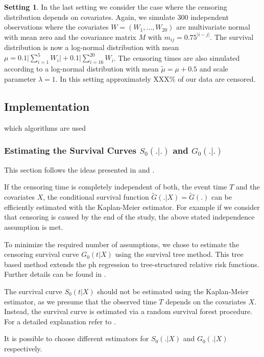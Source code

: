 \documentclass[12pt, a4paper]{article}
\theoremstyle{definition}
\newtheorem{setting}{Setting}
\theoremstyle{plain}
\numberwithin{equation}{section}
\numberwithin{figure}{section}
\numberwithin{table}{section}
\begin{document}
	\begin{setting}
		In the last setting we consider the case where the censoring distribution depends on covariates.
		Again, we simulate 300 independent observations where the covariates $W=(W_1,\dots,W_{20})$ are multivariate normal with mean zero and the covariance matrix $M$ with $m_{ij}=0.75^{\vert i-j\vert}$.
		The survival distribution is now a log-normal distribution with mean $\mu = 0.1 \vert \sum_{i=1}^5 W_i \vert + 0.1 \vert \sum_{i=16}^{20}W_i$.
		The censoring times are also simulated according to a log-normal distribution with mean $\tilde{\mu}=\mu+0.5$ and scale parameter $\lambda = 1$.
		In this setting approximately XXX\% of our data are censored.
	\end{setting}
			
	\subsection{Implementation}
	
	which algorithms are used 
	
	\subsubsection{Estimating the Survival Curves $S_0(.\vert.)$ and $G_0(.\vert.)$}
	This section follows the ideas presented in \citet*{drcut} and \citet*{drtrees}.
	
	If the censoring time is completely independent of both, the event time $T$ and the covariates $X$, the conditional survival function $\tilde{G}(.\vert X)=\tilde{G}(.)$ can be efficiently estimated with the Kaplan-Meier estimator.
	For example if we consider that censoring is caused by the end of the study, the above stated independence assumption is met.
	
	To minimize the required number of assumptions, we chose to estimate the censoring survival curve $G_0(t \vert X)$ using the survival tree method.
	This tree based method extends the ph regression to tree-structured relative risk functions.
	Further details can be found in \citet*{relativerisktrees}.
	
	The survival curve $S_0(t\vert X)$ should not be estimated using the Kaplan-Meier estimator, as we presume that the observed time $T$ depends on the covariates $X$.
	Instead, the survival curve is estimated via a random survival forest procedure.
	For a detailed explanation refer to \citet*{drtrees}.
	
	It is possible to choose different estimators for $S_0(.\vert X)$ and $G_0(.\vert X)$ respectively.
	
\end{document}
